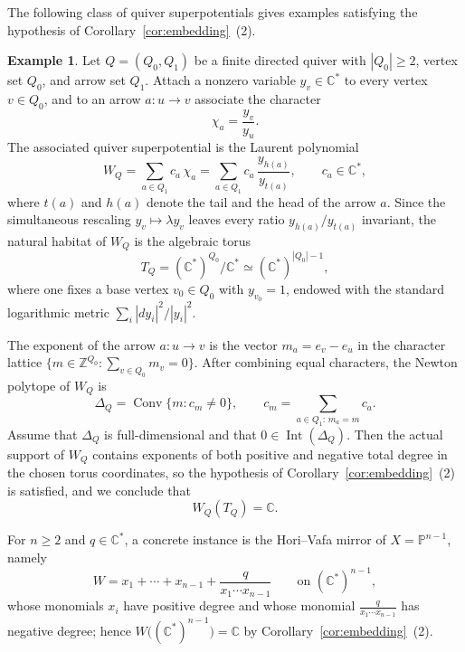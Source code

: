 \documentclass[11pt]{amsart}
\theoremstyle{plain}
\theoremstyle{definition}
\newtheorem{example}[theorem]{Example}
\theoremstyle{remark}
\numberwithin{equation}{section}
\begin{document}
The following class of quiver superpotentials gives examples satisfying the hypothesis of Corollary~\ref{cor:embedding}~(2).

\begin{example}\label{exa:quiver}
    Let $Q=(Q_0,Q_1)$ be a finite directed quiver with $|Q_0|\ge2$, vertex set $Q_0$, and arrow set $Q_1$.
    Attach a nonzero variable $y_v\in\mathbb{C}^*$ to every vertex $v\in Q_0$, and to an arrow $a:u\to v$ associate the character
    \begin{equation*}
        \chi_a=\frac{y_v}{y_u}.
    \end{equation*}
    The associated quiver superpotential is the Laurent polynomial
    \begin{equation*}
        W_Q=\sum_{a\in Q_1}c_a\,\chi_a
        =\sum_{a\in Q_1}c_a\,\frac{y_{h(a)}}{y_{t(a)}},
        \qquad c_a\in\mathbb{C}^*,
    \end{equation*}
    where $t(a)$ and $h(a)$ denote the tail and the head of the arrow $a$.
    Since the simultaneous rescaling $y_v\mapsto\lambda y_v$ leaves every ratio $y_{h(a)}/y_{t(a)}$ invariant, the natural habitat of $W_Q$ is the algebraic torus
    \begin{equation*}
        T_Q=(\mathbb{C}^*)^{Q_0}/\mathbb{C}^*\simeq(\mathbb{C}^*)^{|Q_0|-1},
    \end{equation*}
    where one fixes a base vertex $v_0\in Q_0$ with $y_{v_0}=1$, endowed with the standard logarithmic metric $\sum_i |dy_i|^2/|y_i|^2$.

    The exponent of the arrow $a:u\to v$ is the vector $m_a=e_v-e_u$ in the character lattice $\{m\in\mathbb{Z}^{Q_0}:\sum_{v\in Q_0}m_v=0\}$.
    After combining equal characters, the Newton polytope of $W_Q$ is
    \begin{equation*}
        \Delta_Q=\operatorname{Conv}\{m:c_m\ne0\},\qquad c_m=\sum_{a\in Q_1:\,m_a=m}c_a.
    \end{equation*}
    Assume that $\Delta_Q$ is full-dimensional and that $0\in\operatorname{Int}(\Delta_Q)$.
    Then the actual support of $W_Q$ contains exponents of both positive and negative total degree in the chosen torus coordinates, so the hypothesis of Corollary~\ref{cor:embedding}~(2) is satisfied, and we conclude that
    \begin{equation*}
        W_Q(T_Q)=\mathbb{C}.
    \end{equation*}

    For $n\ge2$ and $q\in\mathbb{C}^*$, a concrete instance is the Hori--Vafa mirror of $X=\mathbb{P}^{n-1}$, namely
    \begin{equation*}
        W=x_1+\cdots+x_{n-1}+\frac{q}{x_1\cdots x_{n-1}}
        \qquad\text{on }(\mathbb{C}^*)^{n-1},
    \end{equation*}
    whose monomials $x_i$ have positive degree and whose monomial $\frac{q}{x_1\cdots x_{n-1}}$ has negative degree; hence $W\bigl((\mathbb{C}^*)^{n-1}\bigr)=\mathbb{C}$ by Corollary~\ref{cor:embedding}~(2).
\end{example}
\end{document}
